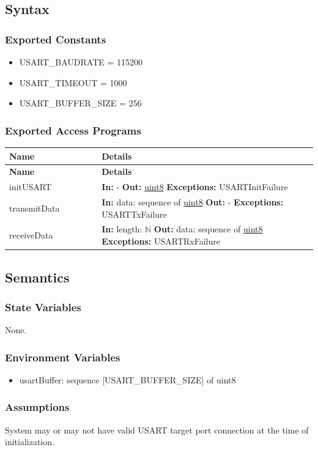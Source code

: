 \documentclass[12pt, titlepage]{article}
\newenvironment{apitable}{%
\begin{center}
\begin{longtable}{|p{0.3\linewidth}|p{0.7\linewidth}|} 
\hline
\textbf{Name} & \textbf{Details} \\
\hline
\endfirsthead
\hline
\textbf{Name} & \textbf{Details} \\
\hline
\endhead
\hline
\endfoot
\hline
\endlastfoot
}{%
\end{longtable}
\end{center}
}
\newcommand{\apifunc}[4]{%
#1 & 
\textbf{In:} #2 \newline
\textbf{Out:} #3 \newline
\textbf{Exceptions:} #4 \\
\hline
}
\begin{document}
\subsection{Syntax}
\subsubsection{Exported Constants}
\begin{itemize}
  \item USART\_BAUDRATE = 115200
  \item USART\_TIMEOUT = 1000
  \item USART\_BUFFER\_SIZE = 256
\end{itemize}

\subsubsection{Exported Access Programs}
\begin{apitable}
  \apifunc{initUSART}
    {-}
    {\hyperref[generic:uint8]{uint8}}
    {USARTInitFailure}
  \apifunc{transmitData}
    {data: sequence of \hyperref[generic:uint8]{uint8}}
    {-}
    {USARTTxFailure}
  \apifunc{receiveData}
    {length: \(\mathbb{N}\)}
    {data: sequence of \hyperref[generic:uint8]{uint8}}
    {USARTRxFailure}
\end{apitable}

\subsection{Semantics}

\subsubsection{State Variables}
None.

\subsubsection{Environment Variables}
\begin{itemize}
  \item usartBuffer: sequence [USART\_BUFFER\_SIZE] of uint8
\end{itemize}

\subsubsection{Assumptions}
System may or may not have valid USART target port connection at the time of
initialization.
\end{document}
